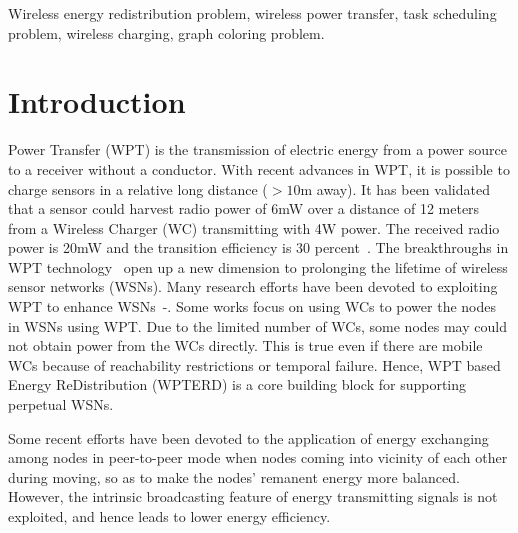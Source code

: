 \documentclass[journal,10pt]{IEEEtran}
\begin{document}
\begin{IEEEkeywords}
Wireless energy redistribution problem, wireless power transfer, task scheduling problem, wireless charging, graph coloring problem.
\end{IEEEkeywords}


\IEEEpeerreviewmaketitle



\section{Introduction}
\label{sec_intro}
\newtheorem{lemma}{\textbf{Lemma}}
\newtheorem{theorem}{\textbf{Theorem}}
\newtheorem{property}{\textbf{P}}
\newtheorem{corollary}{\textbf{Corollary}}
%
%
%
%

 Power Transfer (WPT) is the transmission of electric energy from a power source to a receiver without a conductor. With recent advances in WPT, it is possible to charge sensors in a relative long distance (${>}10$m away)\cite{Guo2017}. It has been validated that a sensor could harvest radio power of 6mW over a distance of 12 meters from a Wireless Charger (WC) transmitting with 4W power. The received radio power is 20mW and the transition efficiency is 30 percent~\cite{Nintana2012}. The breakthroughs in WPT technology~\cite{Kurs2007, Cannon2009} open up a new dimension to prolonging the lifetime of wireless sensor networks (WSNs). Many research efforts have been devoted to exploiting WPT to enhance WSNs~\cite{Xiang2013}-\cite{Madhja2017}. Some works focus on using WCs to power the nodes in WSNs using WPT. Due to the limited number of WCs, some nodes may could not obtain power from the WCs directly. This is true even if there are mobile WCs because of reachability restrictions or temporal failure. Hence, WPT based Energy ReDistribution (WPTERD) is a core building block for supporting perpetual WSNs.

Some recent efforts have been devoted to the application of energy exchanging among nodes in peer-to-peer mode when nodes coming into vicinity of each other during moving, so as to make the nodes' remanent energy more balanced. However, the intrinsic broadcasting feature of energy transmitting signals is not exploited, and hence leads to lower energy efficiency.
\end{document}
